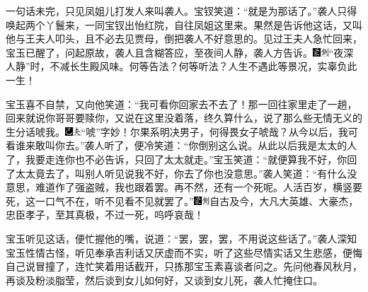 一句话未完，只见凤姐儿打发人来叫袭人。宝钗笑道：``就是为那话了。''袭人只得唤起两个丫鬟来，一同宝钗出怡红院，自往凤姐这里来。果然是告诉他这话，又叫他与王夫人叩头，且不必去见贾母，倒把袭人不好意思的。见过王夫人急忙回来，宝玉已醒了，问起原故，袭人且含糊答应，至夜间人静，袭人方告诉。{\includegraphics[width=3mm]{../Images/00006}\includegraphics[width=3mm]{../Images/00011}\footnotesize \kaishu ``夜深人静''时，不减长生殿风味。何等告法？何等听法？人生不遇此等景况，实辜负此一生！}

宝玉喜不自禁，又向他笑道：``我可看你回家去不去了！那一回往家里走了一趟，回来就说你哥哥要赎你，又说在这里没着落，终久算什么，说了那么些无情无义的生分话唬我。{\includegraphics[width=3mm]{../Images/00003}\includegraphics[width=3mm]{../Images/00012}\footnotesize \kaishu ``唬''字妙！尔果系明决男子，何得畏女子唬哉？}从今以后，我可看谁来敢叫你去。''袭人听了，便冷笑道：``你倒别这么说。从此以后我是太太的人了，我要走连你也不必告诉，只回了太太就走。''宝玉笑道：``就便算我不好，你回了太太竟去了，叫别人听见说我不好，你去了你也没意思。''袭人笑道：``有什么没意思，难道作了强盗贼，我也跟着罢。再不然，还有一个死呢。人活百岁，横竖要死，这一口气不在，听不见看不见就罢了。''{\includegraphics[width=3mm]{../Images/00006}\includegraphics[width=3mm]{../Images/00011}\footnotesize \kaishu 自古及今，大凡大英雄、大豪杰，忠臣孝子，至其真极，不过一死，呜呼哀哉！}

宝玉听见这话，便忙握他的嘴，说道：``罢，罢，罢，不用说这些话了。''袭人深知宝玉性情古怪，听见奉承吉利话又厌虚而不实，听了这些尽情实话又生悲感，便悔自己说冒撞了，连忙笑着用话截开，只拣那宝玉素喜谈者问之。先问他春风秋月，再谈及粉淡脂莹，然后谈到女儿如何好，又谈到女儿死，袭人忙掩住口。

